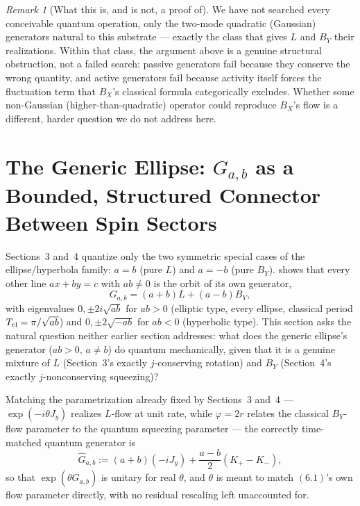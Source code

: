 \documentclass[11pt]{amsart}
\theoremstyle{remark}
\newtheorem*{remark}{Remark}
\begin{document}
\begin{remark}[What this is, and is not, a proof of]
We have not searched every conceivable quantum operation, only the two-mode quadratic (Gaussian) generators natural to this substrate --- exactly the class that gives $L$ and $B_Y$ their realizations. Within that class, the argument above is a genuine structural obstruction, not a failed search: passive generators fail because they conserve the wrong quantity, and active generators fail because activity itself forces the fluctuation term that $B_X$'s classical formula categorically excludes. Whether some non-Gaussian (higher-than-quadratic) operator could reproduce $B_X$'s flow is a different, harder question we do not address here.
\end{remark}

\section{The Generic Ellipse: $G_{a,b}$ as a Bounded, Structured Connector Between Spin Sectors}

Sections~3 and~4 quantize only the two symmetric special cases of the ellipse/hyperbola family: $a=b$ (pure $L$) and $a=-b$ (pure $B_Y$). \cite{Ebert2026EigenCoord} shows that every other line $ax+by=c$ with $ab\ne0$ is the orbit of its own generator,
\begin{equation}
G_{a,b}=(a+b)L+(a-b)B_Y,\tag{6.1}
\end{equation}
with eigenvalues $0,\pm2i\sqrt{ab}$ for $ab>0$ (elliptic type, every ellipse, classical period $T_{\rm cl}=\pi/\sqrt{ab}$) and $0,\pm2\sqrt{-ab}$ for $ab<0$ (hyperbolic type). This section asks the natural question neither earlier section addresses: what does the generic ellipse's generator ($ab>0$, $a\ne b$) do quantum mechanically, given that it is a genuine mixture of $L$ (Section~3's exactly $j$-conserving rotation) and $B_Y$ (Section~4's exactly $j$-nonconserving squeezing)?

Matching the parametrization already fixed by Sections~3 and~4 --- $\exp(-i\theta J_y)$ realizes $L$-flow at unit rate, while $\varphi=2r$ relates the classical $B_Y$-flow parameter to the quantum squeezing parameter --- the correctly time-matched quantum generator is
\begin{equation}
\hat G_{a,b}:=(a+b)(-iJ_y)+\frac{a-b}2(K_+-K_-),\tag{6.2}
\end{equation}
so that $\exp(\theta\hat G_{a,b})$ is unitary for real $\theta$, and $\theta$ is meant to match $(6.1)$'s own flow parameter directly, with no residual rescaling left unaccounted for.
\end{document}
